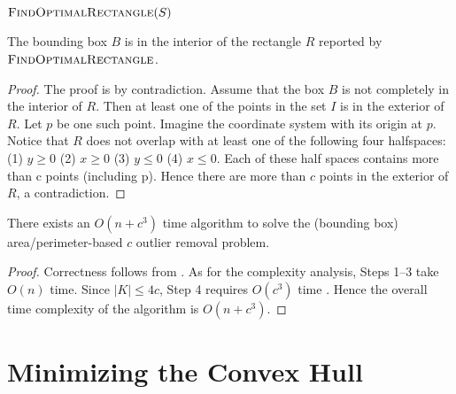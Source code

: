 \documentclass[lotsofwhite]{patmorin}
\begin{document}
\noindent
\begin{minipage}{\textwidth}
$\textsc{FindOptimalRectangle}(S)$
\begin{algorithmic}[1]
\end{algorithmic}
\end{minipage}

\begin{lem}\label{bounding-box-obs}
 The bounding box $B$ is in the interior of the rectangle $R$ reported
 by $\textsc{FindOptimalRectangle}$.
\end{lem}
\begin{proof}
The proof is by contradiction. 
Assume that the box $B$ is not completely in
the interior of $R$. Then at least one of the points in the set $I$ is in the
exterior of $R$. Let $p$ be one such point. Imagine the coordinate
system with its origin at $p$.
Notice that  $R$ does not overlap with at least one of the following four
halfspaces: (1) $y\ge 0$ (2) $x\ge 0$ (3) $y\le 0$  (4) $x\le 0$.  
Each of these half spaces contains more than c points (including p).
Hence there are more than $c$ points in the exterior of $R$, a contradiction.
\end{proof}

\begin{thm}
There exists an $O(n+c^3)$ time algorithm to solve the 
(bounding box) area/perimeter-based $c$ outlier removal problem.
\end{thm}

\begin{proof}
Correctness follows from . As for the complexity
analysis, Steps 1--3 take $O(n)$ time. Since $|K|\le 4c$, Step 4
requires $O(c^3)$ time \cite{sk98}. Hence the overall
time complexity of the algorithm is $O(n+c^3)$.
\end{proof}

\section{Minimizing the Convex Hull}
\end{document}
